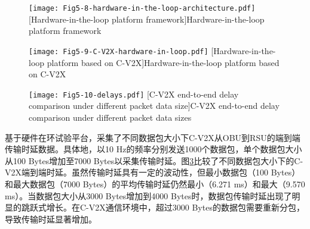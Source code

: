 \begin{figure}[h]
\centering
  \texttt{[image: Fig5-8-hardware-in-the-loop-architecture.pdf]}
  [Hardware-in-the-loop platform framework]{Hardware-in-the-loop platform framework}
  \label{fig 5-7}
\end{figure}

\begin{figure}[h]
\centering
  \texttt{[image: Fig5-9-C-V2X-hardware-in-loop.pdf]}
  [Hardware-in-the-loop platform based on C-V2X]{Hardware-in-the-loop platform based on C-V2X}
  \label{fig 5-8}
\end{figure}

\begin{figure}[h]
\centering
  \texttt{[image: Fig5-10-delays.pdf]}
  [C-V2X end-to-end delay comparison under different packet data size]{C-V2X end-to-end delay comparison under different packet data sizes}
  \label{fig 5-9}
\end{figure}

基于硬件在环试验平台，采集了不同数据包大小下C-V2X从OBU到RSU的端到端传输时延数据。具体地，以10 Hz的频率分别发送1000个数据包，单个数据包大小从100 Bytes增加至7000 Bytes以采集传输时延。图\ref{fig 5-9}比较了不同数据包大小下的C-V2X端到端时延。虽然传输时延具有一定的波动性，但最小数据包（100 Bytes）和最大数据包（7000 Bytes）的平均传输时延仍然最小（6.271 ms）和最大（9.570 ms）。当数据包大小从3000 Bytes增加到4000 Bytes时，数据包传输时延出现了明显的跳跃式增长。在C-V2X通信环境中，超过3000 Bytes的数据包需要重新分包，导致传输时延显著增加。

